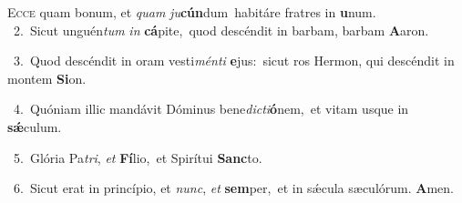 \lettrine{\initial\textcolor{\initialcolor}{E}}{cce} quam bonum, et \textit{quam} \textit{ju}\-\textbf{cún}dum~\star habitáre fratres in \textbf{u}\-num.\\
{\numbfont\textcolor{\numbcolor}{~2.}}~Sicut unguén\textit{tum} \textit{in} \textbf{cá}\-pite,~\star quod descéndit in barbam, barbam \textbf{A}\-aron.\par
{\numbfont\textcolor{\numbcolor}{~3.}}~Quod descéndit in oram vesti\-\textit{mén}\-\textit{ti} \textbf{e}\-jus:~\star sicut ros Hermon, qui descéndit in montem \textbf{Si}\-on.\par
{\numbfont\textcolor{\numbcolor}{~4.}}~Quóniam illic mandávit Dóminus bene\-\textit{dic}\-\textit{ti}\textbf{ó}nem,~\star et vitam usque in \textbf{sǽ}\-culum.\par
{\numbfont\textcolor{\numbcolor}{~5.}}~Glória Pa\-\textit{tri}\-, \textit{et} \textbf{Fí}\-lio,~\star et Spirítui \textbf{Sanc}\-to.\par
{\numbfont\textcolor{\numbcolor}{~6.}}~Sicut erat in princípio, et \textit{nunc}\-, \textit{et} \textbf{sem}\-per,~\star et in sǽcula sæculórum. \textbf{A}\-men.\par

